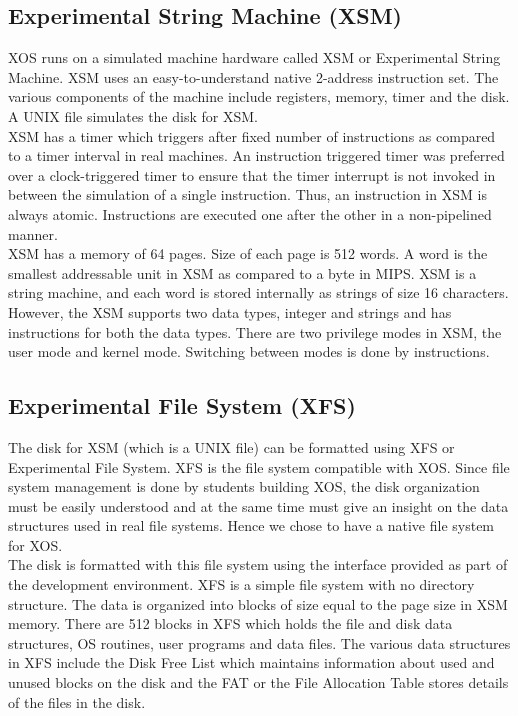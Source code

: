 \documentclass{sig-alternate}
\begin{document}
\subsection{Experimental String Machine (XSM)}
XOS runs on a simulated machine hardware called XSM or Experimental String Machine. XSM uses an easy-to-understand native 2-address instruction set. The various components of the machine include registers, memory, timer and the disk. A UNIX file simulates the disk for XSM.\\

XSM has a timer which triggers after fixed number of instructions as compared to a timer interval in real machines. An instruction triggered timer was preferred over a clock-triggered timer to ensure that the timer interrupt is not invoked in between the simulation of a single instruction. Thus, an instruction in XSM is always atomic. Instructions are executed one after the other in a non-pipelined manner.\\

XSM has a memory of 64 pages. Size of each page is 512 words. A word is the smallest addressable unit in XSM as compared to a byte in MIPS. XSM is a string machine, and each word is stored internally as strings of size 16 characters.  However, the XSM supports two data types, integer and strings and has instructions for both  the data types. There are two privilege modes in XSM, the user mode and kernel mode. Switching between modes is done by instructions.

\subsection{Experimental File System (XFS)}
The disk for XSM (which is a UNIX file) can be formatted using XFS or Experimental File System. XFS is the file system compatible with XOS. Since file system management is done by students building XOS, the disk organization must be easily understood and at the same time must give an insight on the data structures used in real file systems. Hence we chose to have a native file system for XOS.\\

The disk is formatted with this file system using the interface provided as part of the development environment. XFS is a simple file system with no directory structure. The data is organized into blocks of size equal to the page size in XSM memory. There are 512 blocks in XFS which holds the file and disk data structures, OS routines, user programs and data files. The various data structures in XFS include the Disk Free List which maintains information about used and unused blocks on the disk and the FAT or the File Allocation Table stores details of the files in the disk.
\end{document}
